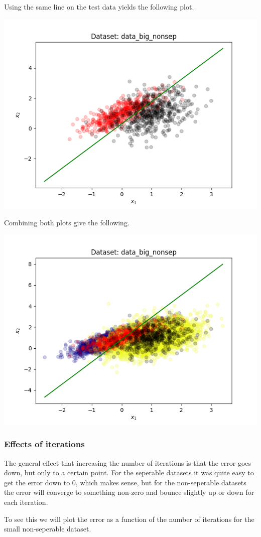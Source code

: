 \documentclass{article}
\begin{document}
Using the same line on the test data yields the following plot.

\begin{centering}
\includegraphics[width=0.9\linewidth]{ex4_scatter_test.png}
\end{centering}

Combining both plots give the following.

\begin{centering}
\includegraphics[width=0.9\linewidth]{ex4_scatter_both.png}
\end{centering}

\subsubsection{Effects of iterations}
The general effect that increasing the number of iterations is that the error goes down, but only to a certain point. For the seperable datasets it was quite easy to get the error down to 0, which makes sense, but for the non-seperable datasets the error will converge to something non-zero and bounce slightly up or down for each iteration. 

To see this we will plot the error as a function of the number of iterations for the small non-seperable dataset. 
\end{document}
